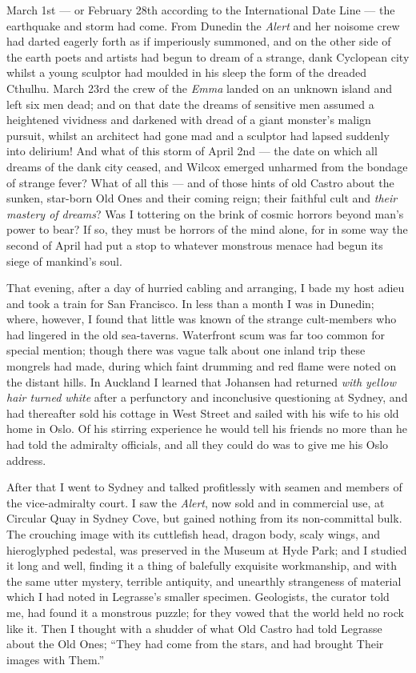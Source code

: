 \begin{pages}
\begin{Leftside}
March 1st --- or February 28th according to the International Date Line ---
the earthquake and storm had come. From Dunedin the \emph{Alert} and her
noisome crew had darted eagerly forth as if imperiously summoned, and on
 the other side of the earth poets and artists had begun to dream of a
strange, dank Cyclopean city whilst a young sculptor had moulded in his
sleep the form of the dreaded Cthulhu. March 23rd the crew of the \emph{Emma}
landed on an unknown island and left six men dead; and on that date the
dreams of sensitive men assumed a heightened vividness and darkened with
dread of a giant monster's malign pursuit, whilst an architect had gone
mad and a sculptor had lapsed suddenly into delirium! And what of this
storm of April 2nd --- the date on which all dreams of the dank city
ceased, and Wilcox emerged unharmed from the bondage of strange fever?
What of all this --- and of those hints of old Castro about the sunken,
star-born Old Ones and their coming reign; their faithful cult and \emph{their
mastery of dreams}? Was I tottering on the brink of cosmic horrors beyond
man's power to bear? If so, they must be horrors of the mind alone, for
in some way the second of April had put a stop to whatever monstrous
menace had begun its siege of mankind's soul.

That evening, after a day of hurried cabling and arranging, I bade my
host adieu and took a train for San Francisco. In less than a month I
was in Dunedin; where, however, I found that little was known of the
strange cult-members who had lingered in the old sea-taverns. Waterfront
scum was far too common for special mention; though there was vague talk
about one inland trip these mongrels had made, during which faint
drumming and red flame were noted on the distant hills. In Auckland I
learned that Johansen had returned \emph{with yellow hair turned white} after a
perfunctory and inconclusive questioning at Sydney, and had thereafter
sold his cottage in West Street and sailed with his wife to his old home
in Oslo. Of his stirring experience he would tell his friends no more
than he had told the admiralty officials, and all they could do was to
give me his Oslo address.

After that I went to Sydney and talked profitlessly with seamen and
members of the vice-admiralty court. I saw the \emph{Alert}, now sold and in
commercial use, at Circular Quay in Sydney Cove, but gained nothing from
its non-committal bulk. The crouching image with its cuttlefish head,
dragon body, scaly wings, and hieroglyphed pedestal, was preserved in
the Museum at Hyde Park; and I studied it long and well, finding it a
thing of balefully exquisite workmanship, and with the same utter
mystery, terrible antiquity, and unearthly strangeness of material which
I had noted in Legrasse's smaller specimen. Geologists, the curator told
me, had found it a monstrous puzzle; for they vowed that the world held
no rock like it. Then I thought with a shudder of what Old Castro had
 told Legrasse about the Old Ones; ``They had come from the stars, and
had brought Their images with Them.''


\end{Leftside}
\end{pages}
